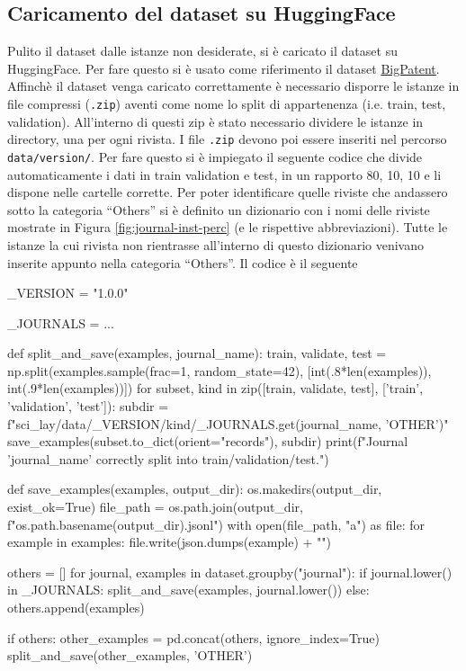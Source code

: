 \documentclass[12pt,a4paper,twoside,openright]{book}
\begin{document}
\subsection{Caricamento del dataset su HuggingFace}
Pulito il dataset dalle istanze non desiderate, si è caricato il dataset su HuggingFace. Per fare questo si è usato come riferimento il dataset \href{https://huggingface.co/datasets/big_patent}{BigPatent}. Affinchè il dataset venga caricato correttamente è necessario disporre le istanze in file compressi (\texttt{.zip}) aventi come nome lo split di appartenenza (i.e. train, test, validation). All'interno di questi zip è stato necessario dividere le istanze in directory, una per ogni rivista. I file \texttt{.zip} devono poi essere inseriti nel percorso \texttt{data/version/}. Per fare questo si è impiegato il seguente codice che divide automaticamente i dati in train validation e test, in un rapporto 80, 10, 10 e li dispone nelle cartelle corrette.
Per poter identificare quelle riviste che andassero sotto la categoria ``Others'' si è definito un dizionario con i nomi delle riviste mostrate in Figura \ref{fig:journal-inst-perc} (e le rispettive abbreviazioni). Tutte le istanze la cui rivista non rientrasse all'interno di questo dizionario venivano inserite appunto nella categoria ``Others''.
Il codice è il seguente 

\begin{python}
_VERSION = "1.0.0"

_JOURNALS = { ... } 

def split_and_save(examples, journal_name):
    train, validate, test = np.split(examples.sample(frac=1, random_state=42), 
                                     [int(.8*len(examples)), int(.9*len(examples))])
    for subset, kind in zip([train, validate, test], ['train', 'validation', 'test']):
        subdir = f"sci_lay/data/{_VERSION}/{kind}/{_JOURNALS.get(journal_name, 'OTHER')}"
        save_examples(subset.to_dict(orient="records"), subdir)
    print(f"Journal '{journal_name}' correctly split into train/validation/test.")

def save_examples(examples, output_dir):
    os.makedirs(output_dir, exist_ok=True)
    file_path = os.path.join(output_dir, f"{os.path.basename(output_dir)}.jsonl")
    with open(file_path, "a") as file:
        for example in examples:
            file.write(json.dumps(example) + "\n")

others = []
for journal, examples in dataset.groupby("journal"):
    if journal.lower() in _JOURNALS:
        split_and_save(examples, journal.lower())
    else:
        others.append(examples)

if others:
    other_examples = pd.concat(others, ignore_index=True)
    split_and_save(other_examples, 'OTHER')

\end{python}
\end{document}
